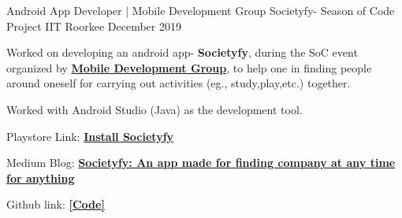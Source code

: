 \begin{cventries}
\cventry
    {Android App Developer | Mobile Development Group } %
    {Societyfy- Season of Code Project} %
    {IIT Roorkee} %
    {December 2019} %
    {
      \begin{cvitems} %
        \item {Worked on developing an android app- \textbf{Societyfy}, during the SoC event organized by \href{https://mdg.iitr.ac.in/}{\bf Mobile Development Group}, to help one in finding people around oneself for carrying out activities (eg., study,play,etc.) together.}
        \item{Worked with Android Studio (Java) as the development tool.}
        \item {Playstore Link: \href{https://play.google.com/store/apps/details?id=in.ac.mdg.iitr.societyfy}{\bf Install Societyfy}}
        \item {Medium Blog: \href{https://medium.com/mobile-development-group/societyfy-an-app-made-for-finding-company-at-anytime-for-anything-842e18151551}{\bf Societyfy: An app made for finding company at any time for anything}}
        \item {Github link: \href{https://github.com/praeclarumjj3/SOCIETYFY}{\bf [Code]}}
      \end{cvitems}
    }

\end{cventries}
